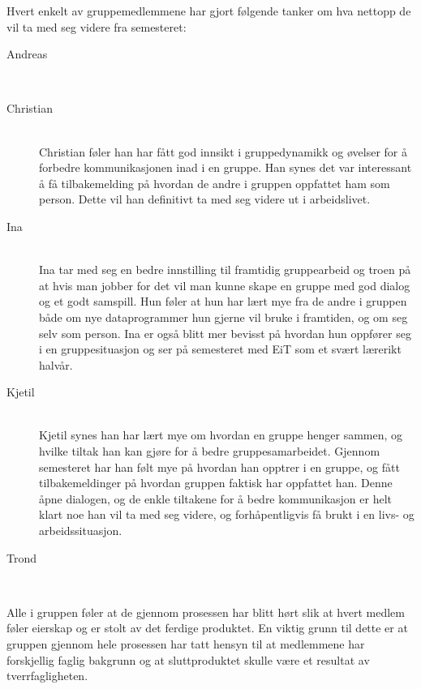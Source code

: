 Hvert enkelt av gruppemedlemmene har gjort følgende tanker om hva nettopp de vil ta med seg videre fra semesteret:
\begin{description}
\item[Andreas] \hfill \\

\item[Christian] \hfill \\
Christian føler han har fått god innsikt i gruppedynamikk og øvelser for å forbedre kommunikasjonen inad i en gruppe. Han synes det var interessant å få tilbakemelding på hvordan de andre i gruppen oppfattet ham som person. Dette vil han definitivt ta med seg videre ut i arbeidslivet.  

\item[Ina] \hfill \\
Ina tar med seg en bedre innstilling til framtidig gruppearbeid og troen på at hvis man jobber for 
det vil man kunne skape en gruppe med god dialog og et godt samspill. Hun føler at hun har lært mye fra de andre
i gruppen både om nye dataprogrammer hun gjerne vil bruke i framtiden, og om seg selv som person.
Ina er også blitt mer bevisst på hvordan hun oppfører seg i en gruppesituasjon og ser på semesteret med
EiT som et svært lærerikt halvår.

\item[Kjetil] \hfill \\
Kjetil synes han har lært mye om hvordan en gruppe henger sammen, og
hvilke tiltak han kan gjøre for å bedre gruppesamarbeidet. Gjennom
semesteret har han følt mye på hvordan han opptrer i en gruppe, og fått
tilbakemeldinger på hvordan gruppen faktisk har oppfattet han. Denne
åpne dialogen, og de enkle tiltakene for å bedre kommunikasjon er helt
klart noe han vil ta med seg videre, og forhåpentligvis få brukt i en
livs- og arbeidssituasjon.

\item[Trond] \hfill \\

\end{description}
Alle i gruppen føler at de gjennom prosessen har blitt hørt slik at hvert medlem føler eierskap og er stolt av det ferdige produktet. 
En viktig grunn til dette er at gruppen gjennom hele prosessen har tatt hensyn til at medlemmene har forskjellig faglig bakgrunn og 
at sluttproduktet skulle være et resultat av tverrfagligheten.


